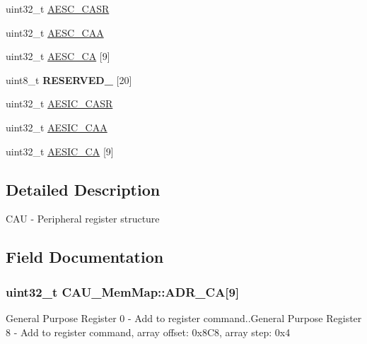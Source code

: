 \begin{DoxyCompactItemize}
\item 
uint32\+\_\+t \hyperlink{struct_c_a_u___mem_map_aef9ec16f001c68f0f8584424c78a8a3c}{A\+E\+S\+C\+\_\+\+C\+A\+S\+R}
\item 
uint32\+\_\+t \hyperlink{struct_c_a_u___mem_map_a9275653d76493cec2822698ce68b4786}{A\+E\+S\+C\+\_\+\+C\+A\+A}
\item 
uint32\+\_\+t \hyperlink{struct_c_a_u___mem_map_acf5e684692c0a798b2c1e00266d2d144}{A\+E\+S\+C\+\_\+\+C\+A} \mbox{[}9\mbox{]}
\item 
\hypertarget{struct_c_a_u___mem_map_a71bc1e040b480b8a0ef89211411bf6b0}{}uint8\+\_\+t {\bfseries R\+E\+S\+E\+R\+V\+E\+D\+\_} \mbox{[}20\mbox{]}\label{struct_c_a_u___mem_map_a71bc1e040b480b8a0ef89211411bf6b0}

\item 
uint32\+\_\+t \hyperlink{struct_c_a_u___mem_map_a87bb091918313f2fb45656cefbc89338}{A\+E\+S\+I\+C\+\_\+\+C\+A\+S\+R}
\item 
uint32\+\_\+t \hyperlink{struct_c_a_u___mem_map_a3a0b8c211ff4b16a8a82d63c2ce98a1f}{A\+E\+S\+I\+C\+\_\+\+C\+A\+A}
\item 
uint32\+\_\+t \hyperlink{struct_c_a_u___mem_map_a4e79ec8ba96bcf899cbb19207a23b160}{A\+E\+S\+I\+C\+\_\+\+C\+A} \mbox{[}9\mbox{]}
\end{DoxyCompactItemize}


\subsection{Detailed Description}
C\+A\+U -\/ Peripheral register structure 

\subsection{Field Documentation}
\hypertarget{struct_c_a_u___mem_map_af599c211258a0c20323c3f482368fa05}{}
\subsubsection[{A\+D\+R\+\_\+\+C\+A}]{\setlength{\rightskip}{0pt plus 5cm}uint32\+\_\+t C\+A\+U\+\_\+\+Mem\+Map\+::\+A\+D\+R\+\_\+\+C\+A\mbox{[}9\mbox{]}}\label{struct_c_a_u___mem_map_af599c211258a0c20323c3f482368fa05}
General Purpose Register 0 -\/ Add to register command..General Purpose Register 8 -\/ Add to register command, array offset\+: 0x8\+C8, array step\+: 0x4 \hypertarget{struct_c_a_u___mem_map_a453c3f0527c3c433b9c4b47e2e1f5c91}{}
